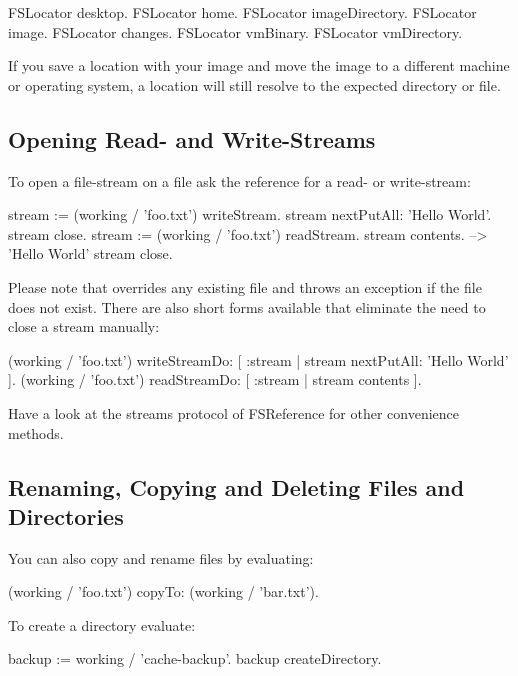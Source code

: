 \documentclass[a4paper,10pt,twoside]{book}
\begin{document}
\begin{code}{}
 FSLocator desktop.
 FSLocator home.
 FSLocator imageDirectory.
 FSLocator image.
 FSLocator changes.
 FSLocator vmBinary.
 FSLocator vmDirectory.
\end{code} 

If you save a location with your image and move the image to a different machine or operating system, a location will still resolve to the expected directory or file.

\subsection{Opening Read- and Write-Streams}

To open a file-stream on a file ask the reference for a read- or write-stream:

\begin{code}{}
 stream := (working / 'foo.txt') writeStream.
 stream nextPutAll: 'Hello World'.
 stream close.
 stream := (working / 'foo.txt') readStream.
 stream contents.			--> 'Hello World'
 stream close.
\end{code}

Please note that  overrides any existing file and  throws an exception if the file does not exist. There are also short forms available that eliminate the need to close a stream manually:

\begin{code}{}
 (working / 'foo.txt') writeStreamDo: [ :stream | stream nextPutAll: 'Hello World' ].
 (working / 'foo.txt') readStreamDo: [ :stream | stream contents ].
\end{code}

Have a look at the streams protocol of FSReference for other convenience methods.

\subsection{Renaming, Copying and Deleting Files and Directories}

You can also copy and rename files by evaluating:

\begin{code}{}
 (working / 'foo.txt') copyTo: (working / 'bar.txt').
\end{code} 

To create a directory evaluate:
\begin{code}{}
 backup := working / 'cache-backup'.
 backup createDirectory.
\end{code} 
\end{document}
